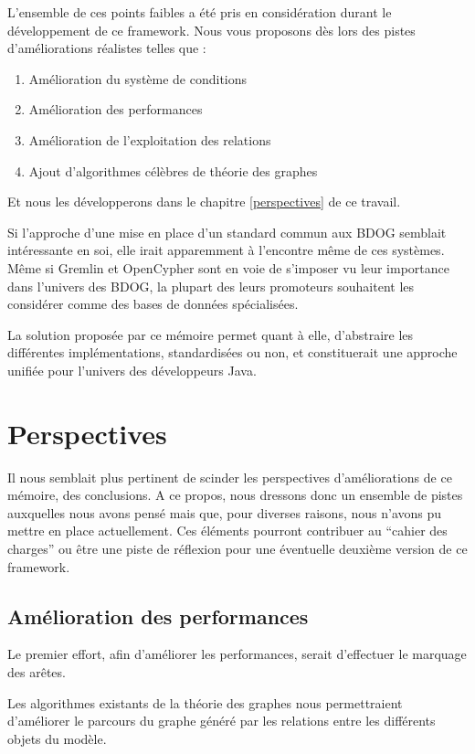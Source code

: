 \documentclass[a4paper,fleqn,12pt,oneside]{book}
\begin{document}
L'ensemble de ces points faibles a été pris en considération durant le développement de ce framework. Nous vous proposons dès lors des pistes d'améliorations réalistes telles que : 
\begin{enumerate}
\item Amélioration du système de conditions
\item Amélioration des performances
\item Amélioration de l'exploitation des relations
\item Ajout d'algorithmes célèbres de théorie des graphes
\end{enumerate}
 
Et nous les développerons dans le chapitre \ref{perspectives} de ce travail.

Si l'approche d'une mise en place d'un standard commun aux BDOG semblait intéressante en soi, elle irait apparemment à l'encontre même de ces systèmes. Même si Gremlin et OpenCypher sont en voie de s'imposer vu leur importance dans l'univers des BDOG, la plupart des leurs promoteurs souhaitent les considérer comme des bases de données spécialisées.

La solution proposée par ce mémoire permet quant à elle, d'abstraire les différentes implémentations, standardisées ou non, et constituerait une approche unifiée pour l'univers des développeurs Java.

\chapter{Perspectives}

Il nous semblait plus pertinent de scinder les perspectives d'améliorations de ce mémoire, des conclusions. A ce propos, nous dressons donc un ensemble de pistes auxquelles nous avons pensé mais que, pour diverses raisons, nous n'avons pu mettre en place actuellement. Ces éléments pourront contribuer au \enquote{cahier des charges} ou être une piste de réflexion pour une éventuelle deuxième version de ce framework.

\label{perspectives}
\section{Amélioration des performances}

Le premier effort, afin d'améliorer les performances, serait d'effectuer le marquage des arêtes.

Les algorithmes existants de la théorie des graphes nous permettraient d'améliorer le parcours du graphe généré par les relations entre les différents objets du modèle\cite{solnontheorie}. 
\end{document}
